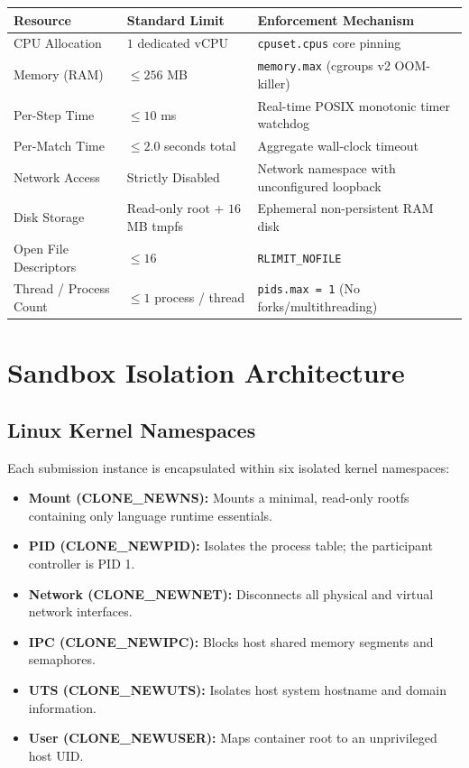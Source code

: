 \documentclass[11pt,a4paper]{article}
\begin{document}
\begin{center}
\begin{tabularx}{\textwidth}{llX}
\toprule
\textbf{Resource} & \textbf{Standard Limit} & \textbf{Enforcement Mechanism} \\
\midrule
CPU Allocation & $1$ dedicated vCPU & \texttt{cpuset.cpus} core pinning \\
Memory (RAM) & $\le 256$ MB & \texttt{memory.max} (cgroups v2 OOM-killer) \\
Per-Step Time & $\le 10$ ms & Real-time POSIX monotonic timer watchdog \\
Per-Match Time & $\le 2.0$ seconds total & Aggregate wall-clock timeout \\
Network Access & Strictly Disabled & Network namespace with unconfigured loopback \\
Disk Storage & Read-only root + $16$MB tmpfs & Ephemeral non-persistent RAM disk \\
Open File Descriptors & $\le 16$ & \texttt{RLIMIT\_NOFILE} \\
Thread / Process Count & $\le 1$ process / thread & \texttt{pids.max = 1} (No forks/multithreading) \\
\bottomrule
\end{tabularx}
\end{center}


\section{Sandbox Isolation Architecture}

\subsection{Linux Kernel Namespaces}
Each submission instance is encapsulated within six isolated kernel namespaces:
\begin{itemize}
    \item \textbf{Mount (CLONE\_NEWNS):} Mounts a minimal, read-only rootfs containing only language runtime essentials.
    \item \textbf{PID (CLONE\_NEWPID):} Isolates the process table; the participant controller is PID 1.
    \item \textbf{Network (CLONE\_NEWNET):} Disconnects all physical and virtual network interfaces.
    \item \textbf{IPC (CLONE\_NEWIPC):} Blocks host shared memory segments and semaphores.
    \item \textbf{UTS (CLONE\_NEWUTS):} Isolates host system hostname and domain information.
    \item \textbf{User (CLONE\_NEWUSER):} Maps container root to an unprivileged host UID.
\end{itemize}
\end{document}
